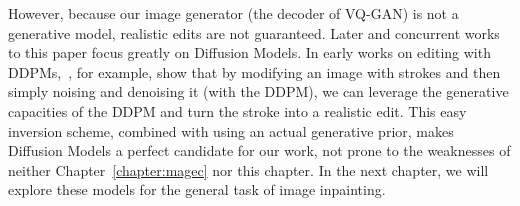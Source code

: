  However, because our image generator (the decoder of VQ-GAN) is not a generative model, 
 realistic edits are not guaranteed. Later and concurrent works to this paper focus greatly 
 on Diffusion Models. In  early works on editing with \ac{DDPM}s,~\citep{meng2022sdedit}, 
 for example, show that by modifying an image with strokes and then simply noising and denoising it (with the \ac{DDPM}),
 we can leverage the generative capacities of the \ac{DDPM} and turn the stroke into a realistic edit. 
 This easy inversion scheme, combined with using an actual generative prior, makes Diffusion Models 
 a perfect candidate for our work, not prone to the weaknesses of neither Chapter~\ref{chapter:magec}
 nor this chapter. In the next chapter, we will explore these models for the general task of 
 image inpainting.







